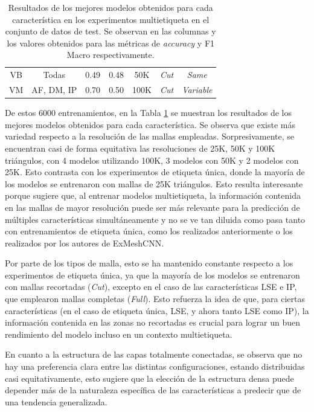 \begin{table}[h]
{\begin{tabular}{|cc|c|c|c|c|c|}
        \multicolumn{1}{|c|}{VB} & Todas & 0.49 & 0.48 & 50K & \textit{Cut} & \textit{Same} \\
        \multicolumn{1}{|c|}{VM} & AF, DM, IP & 0.70 & 0.50 & 100K & \textit{Cut} & \textit{Variable} \\ \hline
    \end{tabular}%
    }
    \caption[Resultados de los mejores modelos obtenidos para cada característica en los experimentos multietiqueta]{Resultados de los mejores modelos obtenidos para cada característica en los experimentos multietiqueta en el conjunto de datos de test. Se observan en las columnas  y  los valores obtenidos para las métricas de \textit{accuracy} y F1 Macro respectivamente.}
    \label{table5:multilabel_results}
    \end{table}

De estos 6000 entrenamientos, en la Tabla \ref{table5:multilabel_results} se muestran los resultados de los mejores modelos obtenidos para cada característica. Se observa que existe más variedad respecto a la resolución de las mallas empleadas. Sorpresivamente, se encuentran casi de forma equitativa las resoluciones de 25K, 50K y 100K triángulos, con 4 modelos utilizando 100K, 3 modelos con 50K y 2 modelos con 25K. Esto contrasta con los experimentos de etiqueta única, donde la mayoría de los modelos se entrenaron con mallas de 25K triángulos. Esto resulta interesante porque sugiere que, al entrenar modelos multietiqueta, la información contenida en las mallas de mayor resolución puede ser más relevante para la predicción de múltiples características simultáneamente y no se ve tan diluida como pasa tanto con entrenamientos de etiqueta única, como los realizados anteriormente o los realizados por los autores de ExMeshCNN.

Por parte de los tipos de malla, esto se ha mantenido constante respecto a los experimentos de etiqueta única, ya que la mayoría de los modelos se entrenaron con mallas recortadas (\textit{Cut}), excepto en el caso de las características LSE e IP, que emplearon mallas completas (\textit{Full}). Esto refuerza la idea de que, para ciertas características (en el caso de etiqueta única, LSE, y ahora tanto LSE como IP), la información contenida en las zonas no recortadas es crucial para lograr un buen rendimiento del modelo incluso en un contexto multietiqueta.

En cuanto a la estructura de las capas totalmente conectadas, se observa que no hay una preferencia clara entre las distintas configuraciones, estando distribuidas casi equitativamente, esto sugiere que la elección de la estructura densa puede depender más de la naturaleza específica de las características a predecir que de una tendencia generalizada.

